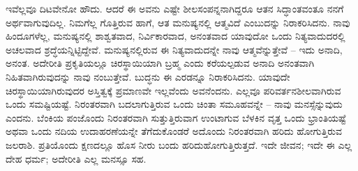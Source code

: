 ಇವೆಲ್ಲವೂ ದಿಟವೇನೋ ಹೌದು. ಆದರೆ ಈ ಅವನು ಎಷ್ಟೇ ಶೀಲಸಂಪನ್ನನಾಗಿದ್ದರೂ ಆತನ ಸಿದ್ಧಾಂತವಂತೂ ನನಗೆ ಅರ್ಥವಾಗುವುದಿಲ್ಲ. ನಿಮಗೆಲ್ಲ ಗೊತ್ತಿರುವ ಹಾಗೆ, ಆತ ಮನುಷ್ಯನಲ್ಲಿ ಆತ್ಮವಿದೆ ಎಂಬುದನ್ನು ನಿರಾಕರಿಸಿದನು. ನಾವು ಹಿಂದೂಗಳೆಲ್ಲ, ಮನುಷ್ಯನಲ್ಲಿ ಶಾಶ್ವತವಾದ, ನಿರ್ವಿಕಾರವಾದ, ಅನಂತವಾದ ಯಾವುದೋ ಒಂದು ನಿತ್ಯವಾದುದರಲ್ಲಿ ಅಚಲವಾದ ಶ್ರದ್ಧೆಯನ್ನಿಟ್ಟಿದ್ದೇವೆ. ಮನುಷ್ಯನಲ್ಲಿರುವ ಈ ನಿತ್ಯವಾದುದನ್ನೇ ನಾವು ಆತ್ಮವೆನ್ನುತ್ತೇವೆ – ಇದು ಅನಾದಿ, ಅನಂತ. ಅದೇರೀತಿ ಪ್ರಕೃತಿಯಲ್ಲೂ ಚಿರಸ್ಥಾಯಿಯಾಗಿ ಬ್ರಹ್ಮ ಎಂದು ಕರೆಯಲ್ಪಡುವ ಅನಾದಿ ಅನಂತವಾಗಿ ನಿಹಿತವಾಗಿರುವುದನ್ನು ನಾವು ನಂಬುತ್ತೇವೆ. ಬುದ್ಧನು ಈ ಎರಡನ್ನೂ ನಿರಾಕರಿಸಿದನು. ಯಾವುದೇ ಚಿರಸ್ಥಾಯಿಯಾಗಿರುವುದರ ಅಸ್ತಿತ್ವಕ್ಕೆ ಪ್ರಮಾಣವೇ ಇಲ್ಲವೆಂದು ಅವನೆಂದನು. ಎಲ್ಲವೂ ಪರಿವರ್ತನಶೀಲವಾಗಿರುವ ಒಂದು ಸಮಷ್ಟಿಯಷ್ಟೆ. ನಿರಂತರವಾಗಿ ಬದಲಾಗುತ್ತಿರುವ ಒಂದು ಚಿಂತಾ ಸಮೂಹವನ್ನೇ – ನಾವು ಮನಸ್ಸೆನ್ನುವುದು ಎಂದನು. ಬೆಂಕಿಯ ಪಂಜೊಂದು ನಿರಂತರವಾಗಿ ಸುತ್ತುತ್ತಿರುವಾಗ ಉಂಟಾಗುವ ಬೆಳಕಿನ ವೃತ್ತ ಒಂದು ಭ್ರಾಂತಿಯಷ್ಟೆ ಅಥವಾ ಒಂದು ನದಿಯ ಉದಾಹರಣೆಯನ್ನೇ ತೆಗೆದುಕೊಂಡರೆ ಅದೊಂದು ನಿರಂತರವಾಗಿ ಹರಿದು ಹೋಗುತ್ತಿರುವ ಜಲರಾಶಿ. ಪ್ರತಿಯೊಂದು ಕ್ಷಣದಲ್ಲೂ ಹೊಸ ನೀರು ಬಂದು ಹರಿದುಹೋಗುತ್ತಿರುತ್ತದೆ. ಇದೇ ಜೀವನ; ಇದೇ ಈ ಎಲ್ಲ ದೇಹ ಧರ್ಮ; ಅದೇರೀತಿ ಎಲ್ಲ ಮನಸ್ಸೂ ಸಹ.

